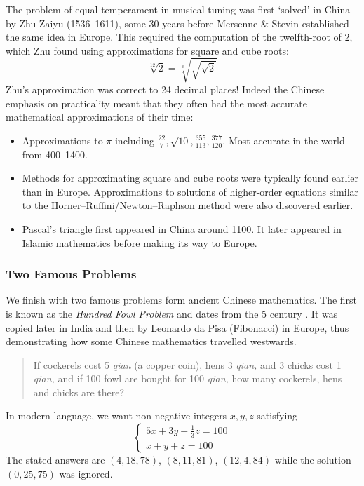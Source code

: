 The problem of equal temperament in musical tuning was first `solved' in China by Zhu Zaiyu (1536--1611), some 30 years before Mersenne \& Stevin established the same idea in Europe. This required the computation of the twelfth-root of 2, which Zhu found using approximations for square and cube roots:
\[
	\sqrt[12]{2}=\sqrt[3]{\sqrt{\sqrt 2}}
\]
Zhu's approximation was correct to 24 decimal places! Indeed the Chinese emphasis on practicality meant that they often had the most accurate mathematical approximations of their time:
\begin{itemize}
  \item Approximations to $\pi$ including $\frac{22}7,\sqrt{10},\frac{355}{113},\frac{377}{120}$. Most accurate in the world from 400--1400.
  \item Methods for approximating square and cube roots were typically found earlier than in Europe. Approximations to solutions of higher-order equations similar to the Horner--Ruffini/Newton--Raphson method were also discovered earlier.
  \item Pascal's triangle first appeared in China around 1100. It later appeared in Islamic mathematics before making its way to Europe.
\end{itemize}



\subsubsection*{Two Famous Problems}

We finish with two famous problems form ancient Chinese mathematics. The first is known as the  \emph{Hundred Fowl Problem} and dates from the 5\th{} century \AD\!. It was copied later in India and then by Leonardo da Pisa (Fibonacci) in Europe, thus demonstrating how some Chinese mathematics travelled westwards.

\begin{quote}
	If cockerels cost 5 \emph{qian } (a copper coin), hens 3 \emph{qian,} and 3 chicks cost 1 \emph{qian,} and if 100 fowl are bought for 100 \emph{qian,} how many cockerels, hens and chicks are there?
\end{quote}

In modern language, we want non-negative integers $x,y,z$ satisfying
\[
	\begin{cases}
	  5x+3y+\frac 13z=100\\
	  x+y+z=100
  \end{cases}
\]
The stated answers are $(4,18,78)$, $(8,11,81)$, $(12,4,84)$ while the solution $(0,25,75)$ was ignored.
\bigbreak

